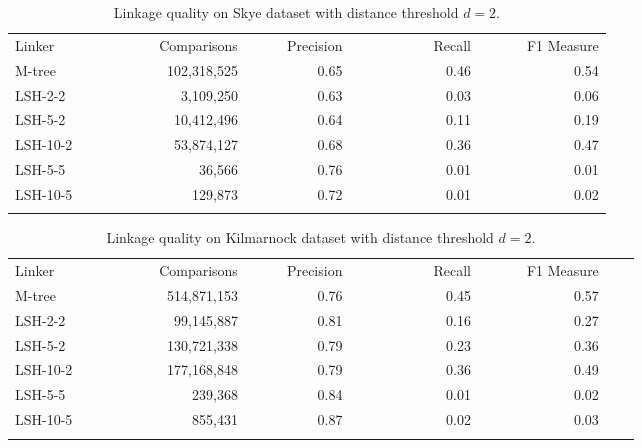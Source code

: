 \documentclass{llncs}
\begin{document}
\begin{table}[t]
\caption{Linkage quality on Skye dataset with distance threshold
$d= 2$.}
\label{comparison-of-results-demography-skye}
\centering
\begin{footnotesize}
\begin{tabular}{lrrrr} \hline\noalign{\smallskip}
  Linker~~~~~~~~~~ & ~~~Comparisons & ~~~~~Precision & 
  ~~~~~~~~~~~Recall & ~~~~~~F1 Measure \\
\noalign{\smallskip} \hline \noalign{\smallskip}
M-tree    & 102,318,525                 & 0.65      & 0.46   & 0.54      \\
\noalign{\smallskip} \hline \noalign{\smallskip}
LSH-2-2  & 3,109,250                   & 0.63      & 0.03   & 0.06       \\

LSH-5-2  & 10,412,496                  & 0.64      & 0.11   & 0.19       \\

LSH-10-2 & 53,874,127                  & 0.68      & 0.36   & 0.47       \\

LSH-5-5  & 36,566                     & 0.76      & 0.01   & 0.01       \\

LSH-10-5 & 129,873                    & 0.72      & 0.01   & 0.02       \\
\noalign{\smallskip} \hline
\end{tabular}
\end{footnotesize}
\end{table}


\begin{table}[t]
\caption{Linkage quality on Kilmarnock dataset with distance
threshold $d= 2$.}
\label{comparison-of-results-demography-kili}
\centering
\begin{footnotesize}
\begin{tabular}{lrrrrrr} \hline\noalign{\smallskip}
  Linker~~~~~~~~~~ & ~~~Comparisons & ~~~~~Precision & 
  ~~~~~~~~~~~Recall & ~~~~~~F1 Measure \\
\noalign{\smallskip} \hline \noalign{\smallskip}
M-tree     & 514,871,153                   & 0.76      & 0.45   & 0.57      \\
\noalign{\smallskip} \hline \noalign{\smallskip}
LSH-2-2   & 99,145,887                    & 0.81      & 0.16   & 0.27       \\
LSH-5-2   & 130,721,338                   & 0.79      & 0.23   & 0.36       \\
LSH-10-2  & 177,168,848                   & 0.79      & 0.36   & 0.49       \\
LSH-5-5   & 239,368                      & 0.84      & 0.01   & 0.02       \\
LSH-10-5  & 855,431                      & 0.87      & 0.02   & 0.03 \\ 
\noalign{\smallskip} \hline
\end{tabular}
\end{footnotesize}
\end{table}
\end{document}
